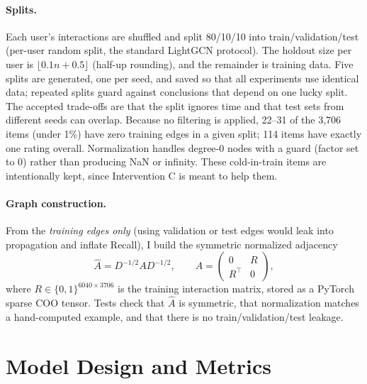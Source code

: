 \documentclass{article}
\begin{document}
\paragraph{Splits.} Each user's interactions are shuffled and split 80/10/10 into train/validation/test (per-user random split, the standard LightGCN protocol). The holdout size per user is $\lfloor 0.1 n + 0.5 \rfloor$ (half-up rounding), and the remainder is training data. Five splits are generated, one per seed, and saved so that all experiments use identical data; repeated splits guard against conclusions that depend on one lucky split. The accepted trade-offs are that the split ignores time and that test sets from different seeds can overlap. Because no filtering is applied, 22--31 of the 3,706 items (under 1\%) have zero training edges in a given split; 114 items have exactly one rating overall. Normalization handles degree-0 nodes with a guard (factor set to 0) rather than producing NaN or infinity. These cold-in-train items are intentionally kept, since Intervention C is meant to help them.

\paragraph{Graph construction.} From the \emph{training edges only} (using validation or test edges would leak into propagation and inflate Recall), I build the symmetric normalized adjacency
\begin{equation}
\hat{A} = D^{-1/2} A D^{-1/2}, \qquad A = \begin{pmatrix} 0 & R \\ R^\top & 0 \end{pmatrix},
\end{equation}
where $R \in \{0,1\}^{6040 \times 3706}$ is the training interaction matrix, stored as a PyTorch sparse COO tensor. Tests check that $\hat{A}$ is symmetric, that normalization matches a hand-computed example, and that there is no train/validation/test leakage.

\section{Model Design and Metrics}
\end{document}
